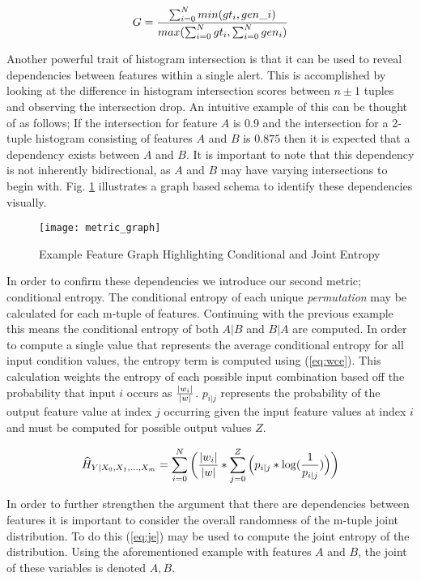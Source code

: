 \begin{equation}
\label{eq:intersection}
G = {{\sum_{i=0}^{N} min(gt_i, gen\_i)} \over {max(\sum_{i=0}^{N} gt_i, \sum_{i=0}^{N} gen_i)}}
\end{equation}

Another powerful trait of histogram intersection is that it can be used to reveal dependencies between features within a single alert. This is accomplished by looking at the difference in histogram intersection scores between $n\pm1$ tuples and observing the intersection drop. An intuitive example of this can be thought of as follows; If the intersection for feature $A$ is 0.9 and the intersection for a 2-tuple histogram consisting of features $A$ and $B$ is $0.875$ then it is expected that a dependency exists between $A$ and $B$. It is important to note that this dependency is not inherently bidirectional, as $A$ and $B$ may have varying intersections to begin with. Fig. \ref{fig:metric_graph} illustrates a graph based schema to identify these dependencies visually. 

\begin{figure}[!htbp]
	\centering%
	\texttt{[image: metric\_graph]}
	\caption{
		Example Feature Graph Highlighting Conditional and Joint Entropy
	}
	\label{fig:metric_graph}
\end{figure}

In order to confirm these dependencies we introduce our second metric; conditional entropy. The conditional entropy of each unique \emph{permutation} may be calculated for each m-tuple of features. Continuing with the previous example this means the conditional entropy of both $A|B$ and $B|A$ are computed. In order to compute a single value that represents the average conditional entropy for all input condition values, the entropy term is computed using (\ref{eq:wce}). This calculation weights the entropy of each possible input combination based off the probability that input $i$ occurs as ${{|w_i|} \over {|w|}}$. ${p_{i|j}}$ represents the probability of the output feature value at index $j$ occurring given the input feature values at index $i$ and must be computed for possible output values $Z$.

\begin{equation}
\label{eq:wce}
\widehat{H}_{Y|X_0, X_1, ..., X_m} = \sum_{i=0}^{N} \bigg({{|w_i|} \over {|w|}} * {\sum_{j=0}^{Z}\Big({p_{i|j} * \log ({1 \over{p_{i|j}}})}\Big)}\bigg)
\end{equation}

In order to further strengthen the argument that there are dependencies between features it is important to consider the overall randomness of the m-tuple joint distribution. To do this (\ref{eq:je}) may be used to compute the joint entropy of the distribution. Using the aforementioned example with features $A$ and $B$, the joint of these variables is denoted $A,B$.


